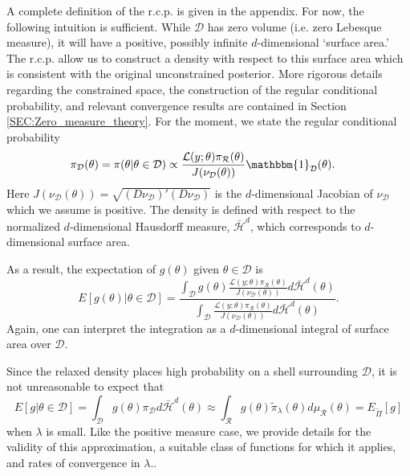 \documentclass[10pt,fleqn]{article}
\DeclareMathOperator{\1}{\mathbbm{1}}
\begin{document}
A complete definition of the r.c.p. is given in the appendix. For now, the following intuition is sufficient.   While $\mathcal{D}$ has zero volume (i.e. zero Lebesque measure), it will have a positive, possibly infinite $d$-dimensional `surface area.' The r.c.p. allow us to construct a density with respect to this surface area which is consistent with the original unconstrained posterior. More rigorous details regarding the constrained space, the construction of the regular conditional probability, and relevant convergence results are contained in Section \ref{SEC:Zero_measure_theory}.  For the moment, we state the regular conditional probability
\begin{equation}
\label{EQ:RCP_posterior}
\begin{split}
\pi_\mathcal{D}(\theta) = \pi(\theta| \theta \in \mathcal{D}) 
&\propto \frac{\mathcal{L}(y;\theta)\pi_\mathcal{R}(\theta)}{J(\nu_\mathcal{D}(\theta))}\mathbbm{1}_\mathcal{D}(\theta) .
\end{split}
\end{equation}
Here $J(\nu_\mathcal{D}(\theta)) = \sqrt{(D\nu_\mathcal{D})'(D\nu_\mathcal{D})}$ is the $d$-dimensional Jacobian of $\nu_\mathcal{D}$ which we assume is positive.  The density is defined with respect to the normalized $d$-dimensional Hausdorff measure, $\bar{\mathcal{H}}^d$, which corresponds to $d$-dimensional surface area.  

As a result, the expectation of $g(\theta)$ given $\theta\in\mathcal{D}$ is $$E[g(\theta) | \theta \in \mathcal{D}] = \dfrac{\int_\mathcal{D} g(\theta) \frac{\mathcal{L}(y;\theta)\pi_\mathcal{R}(\theta)}{J(\nu_\mathcal{D}(\theta))}d\bar{\mathcal{H}}^d(\theta) } {\int_\mathcal{D} \frac{\mathcal{L}(y;\theta)\pi_\mathcal{R}(\theta)}{J(\nu_\mathcal{D}(\theta))} d\bar{\mathcal{H}}^d(\theta)}. $$
Again, one can interpret the integration as a $d$-dimensional integral of surface area over $\mathcal{D}.$ 

Since the relaxed density places high probability on a shell surrounding $\mathcal{D}$, it is not unreasonable to expect that $$E[g|\theta\in\mathcal{D} ] = \int_\mathcal{D} g(\theta) \pi_\mathcal{D} d\bar{\mathcal{H}}^d(\theta) \approx \int_\mathcal{R} g(\theta) \tilde{\pi}_\lambda(\theta) d\mu_\mathcal{R}(\theta) = E_{\tilde{\Pi}}[g]$$
when $\lambda$ is small.
Like the positive measure case, we provide details for the validity of this approximation, a suitable class of functions for which it applies, and rates of convergence in $\lambda$.. 
\end{document}
